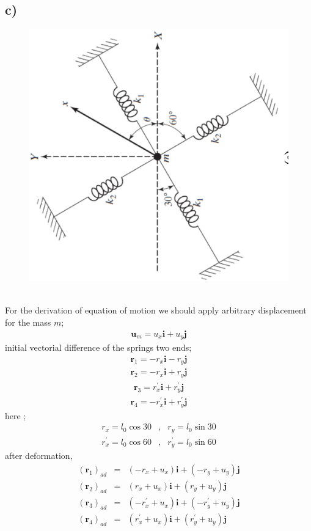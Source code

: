 \documentclass[]{report}
\begin{document}
\subsection*{c)}
\begin{figure}[ht!]
\centering
\includegraphics[width=0.5\linewidth,angle=-90]{./problem1c}
\caption{}
\label{fig:problem1c}
\end{figure}
~\\
For the derivation of equation of motion we should apply arbitrary displacement for the mass $m$;
\begin{eqnarray*}
\mathbf{u}_m= u_x \mathbf{i}+u_y \mathbf{j}
\end{eqnarray*}
initial vectorial difference of the springs two ends;
\begin{eqnarray*}
\mathbf{r}_1= -r_x \mathbf{i}-r_y \mathbf{j}
\end{eqnarray*}
\begin{eqnarray*}
\mathbf{r}_2= -r_x \mathbf{i}+r_y \mathbf{j}
\end{eqnarray*}
\begin{eqnarray*}
\mathbf{r}_3= r^{'}_x \mathbf{i}+{r^{'}_y} \mathbf{j}
\end{eqnarray*}
\begin{eqnarray*}
\mathbf{r}_4= -r^{'}_x \mathbf{i}+{r^{'}_y} \mathbf{j}
\end{eqnarray*}
here ;
\begin{eqnarray*}
{r}_x= l_0 \cos{30} &,&r_y= l_0 \sin{30}\\
r^{'}_x= l_0 \cos{60} &,&r^{'}_y= l_0 \sin{60}
\end{eqnarray*}
after deformation,
\begin{eqnarray*}
\left(\mathbf{r}_1\right)_{ad}&=&{\left(-r_x+u_x\right)} \mathbf{i}+{\left(-r_y+u_y\right)} \mathbf{j}\\
\left(\mathbf{r}_2\right)_{ad}&=&{\left(r_x+u_x\right)} \mathbf{i}+{\left(r_y+u_y\right)} \mathbf{j}\\
\left(\mathbf{r}_3\right)_{ad}&=&{\left(-r^{'}_x+u_x\right)} \mathbf{i}+{\left(-r^{'}_y+u_y\right)} \mathbf{j}\\
\left(\mathbf{r}_4\right)_{ad}&=&{\left(r^{'}_x+u_x\right)} \mathbf{i}+{\left(r^{'}_y+u_y\right)} \mathbf{j}
\end{eqnarray*}
\end{document}
